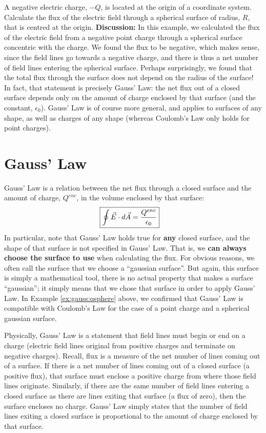 \begin{example}{A negative electric charge, $-Q$, is located at the origin of a coordinate system. Calculate the flux of the electric field through a spherical surface of radius, $R$, that is centred at the origin.}
\textbf{Discussion: }In this example, we calculated the flux of the electric field from a negative point charge through a spherical surface concentric with the charge. We found the flux to be negative, which makes sense, since the field lines go towards a negative charge, and there is thus a net number of field lines entering the spherical surface. Perhaps surprisingly, we found that the total flux through the surface does not depend on the radius of the surface! In fact, that statement is precisely Gauss' Law: the net flux out of a closed surface depends only on the amount of charge enclosed by that surface (and the constant, $\epsilon_0$). Gauss' Law is of course more general, and applies to surfaces of any shape, as well as charges of any shape (whereas Coulomb's Law only holds for point charges). 
\end{example}

\section{Gauss' Law}
Gauss' Law is a relation between the net flux through a closed surface and the amount of charge, $Q^{enc}$, in the volume enclosed by that surface:
\begin{align*}
\Aboxed{\oint \vec E\cdot d\vec A=\frac{Q^{enc}}{\epsilon_0}}
\end{align*}
In particular, note that Gauss' Law holds true for \textbf{any} closed surface, and the shape of that surface is not specified in Gauss' Law. That is, we \textbf{can always choose the surface to use} when calculating the flux. For obvious reasons, we often call the surface that we choose a ``gaussian surface''. But again, this surface is simply a mathematical tool, there is no actual property that makes a surface ``gaussian''; it simply means that we chose that surface in order to apply Gauss' Law. In Example \ref{ex:gauss:qsphere} above, we confirmed that Gauss' Law is compatible with Coulomb's Law for the case of a point charge and a spherical gaussian surface. 

Physically, Gauss' Law is a statement that field lines must begin or end on a charge (electric field lines original from positive charges and terminate on negative charges). Recall, flux is a measure of the net number of lines coming out of a surface. If there is a net number of lines coming out of a closed surface (a positive flux), that surface must enclose a positive charge from where those field lines originate. Similarly, if there are the same number of field lines entering a closed surface as there are lines exiting that surface (a flux of zero), then the surface encloses no charge. Gauss' Law simply states that the number of field lines exiting a closed surface is proportional to the amount of charge enclosed by that surface.

